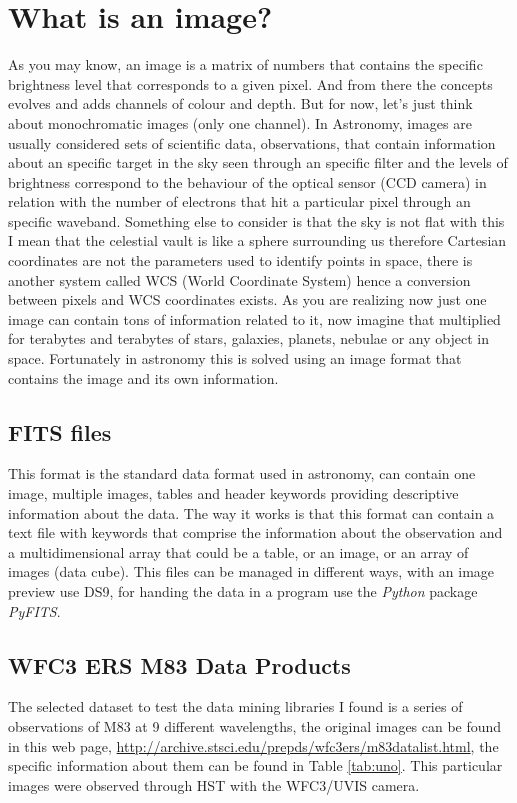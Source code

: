 \documentclass[11pt,fleqn]{book} %
\begin{document}
\section{What is an image?}
	As you may know, an image is a matrix of numbers that contains the specific brightness level that corresponds to a given pixel. And from there the concepts evolves and adds channels of colour and depth. But for now, let's just think about monochromatic images (only one channel). In Astronomy, images are usually considered sets of scientific data, observations, that contain information about an specific target in the sky seen through an specific filter and the levels of brightness correspond to the behaviour of the optical sensor (CCD camera) in relation with the number of electrons that hit a particular pixel through an specific waveband. Something else to consider is that the sky is not flat with this I mean that the celestial vault is like a sphere surrounding us therefore Cartesian coordinates are not the parameters used to identify points in space, there is another system called WCS (World Coordinate System) hence a conversion between pixels and WCS coordinates exists. As you are realizing now just one image can contain tons of information related to it, now imagine that multiplied for terabytes and terabytes of stars, galaxies, planets, nebulae or any object in space. Fortunately in astronomy this is solved using an image format that contains the image and its own information.
	\subsection{FITS files}
    	This format is the standard data format used in astronomy, can contain one image, multiple images, tables and header keywords providing descriptive information about the data. The way it works is that this format can contain a text file with keywords that comprise the information about the observation and a multidimensional array that could be a table, or an image, or an array of images (data cube). This files can be managed in different ways, with an image preview use DS9, for handing the data in a program use the \emph{Python} package \emph{PyFITS}.
        
	\subsection{WFC3 ERS M83 Data Products}
    The selected dataset to test the data mining libraries I found is a series of observations of M83 at 9 different wavelengths, the original images can be found in this web page, \url{http://archive.stsci.edu/prepds/wfc3ers/m83datalist.html}, the specific information about them can be found in Table \ref{tab:uno}. This particular images were observed through HST with the WFC3/UVIS camera.
    
\end{document}

